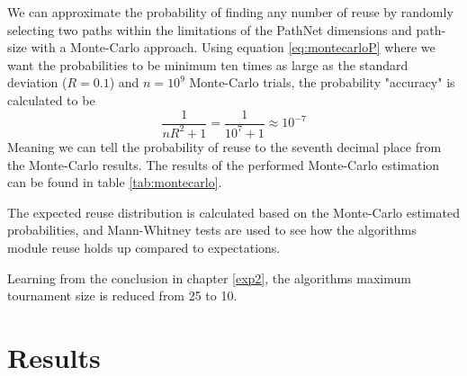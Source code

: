 

We can approximate the probability of finding any number of reuse by randomly selecting two paths within the limitations of the PathNet dimensions and path-size with a Monte-Carlo approach. Using equation \ref{eq:montecarloP} where we want the probabilities to be minimum ten times as large as the standard deviation (\(R=0.1\)) and \(n=10^{9}\) Monte-Carlo trials, the probability "accuracy" is calculated to be
\begin{equation*}
    \frac{1}{nR^{2}+1}=\frac{1}{10^{7}+1}\approx10^{-7}
\end{equation*}
Meaning we can tell the probability of reuse to the seventh decimal place from the Monte-Carlo results. The results of the performed Monte-Carlo estimation can be found in table \ref{tab:montecarlo}.

The expected reuse distribution is calculated based on the Monte-Carlo estimated probabilities, and Mann-Whitney tests are used to see how the algorithms module reuse holds up compared to expectations.

Learning from the conclusion in chapter \ref{exp2}, the algorithms maximum tournament size is reduced from 25 to 10.

\section{Results}

